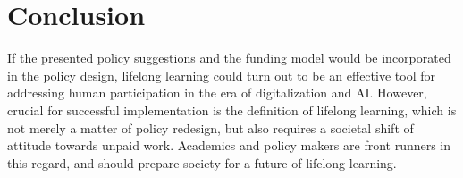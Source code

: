 \section*{Conclusion}

If the presented policy suggestions and the funding model would be incorporated in the policy design, lifelong learning could turn out to be an effective tool for addressing human participation in the era of digitalization and AI. However, crucial for successful implementation is the definition of lifelong learning, which is not merely a matter of policy redesign, but also requires a societal shift of attitude towards unpaid work. Academics and policy makers are front runners in this regard, and should prepare society for a future of lifelong learning.  

 